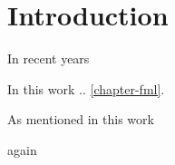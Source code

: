 
\chapter{ Introduction } \label{chapter-intro}

In recent years

\newpage

In this work .. \autoref{chapter-fml}. 

As mentioned in this work \cite{Lopez-de-Prado-AFML-2018}

again \cite{Lopez-de-Prado-AFML-2018}



